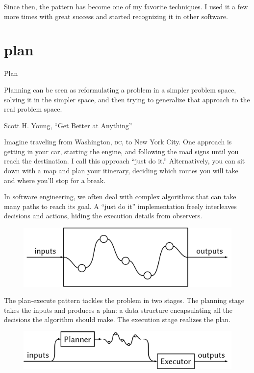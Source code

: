 \documentclass{article}
\begin{document}
Since then, the pattern has become one of my favorite techniques.
I used it a few more times with great success and started recognizing it in other software.

\section{plan}{Plan}

\epigraph{
    Planning can be seen as reformulating a problem in a simpler problem space, solving it in the simpler space, and then trying to generalize that approach to the real problem space.
}{Scott H. Young, ``Get Better at Anything''}

Imagine traveling from Washington, \textsc{dc}, to New York City.
One approach is getting in your car, starting the engine, and following the road signs until you reach the destination.
I call this approach ``just do it.''
Alternatively, you can sit down with a map and plan your itinerary, deciding which routes you will take and where you'll stop for a break.

In software engineering, we often deal with complex algorithms that can take many paths to reach its goal.
A ``just do it'' implementation freely interleaves decisions and actions, hiding the execution details from observers.

\begin{figure}[grayscale-diagram]
\includegraphics{images/29-just-do-it.svg}
\end{figure}

The plan-execute pattern tackles the problem in two stages.
The planning stage takes the inputs and produces a plan: a data structure encapsulating all the decisions the algorithm should make.
The execution stage realizes the plan.

\begin{figure}[grayscale-diagram]
\includegraphics{images/29-plan-execute.svg}
\end{figure}
\end{document}
